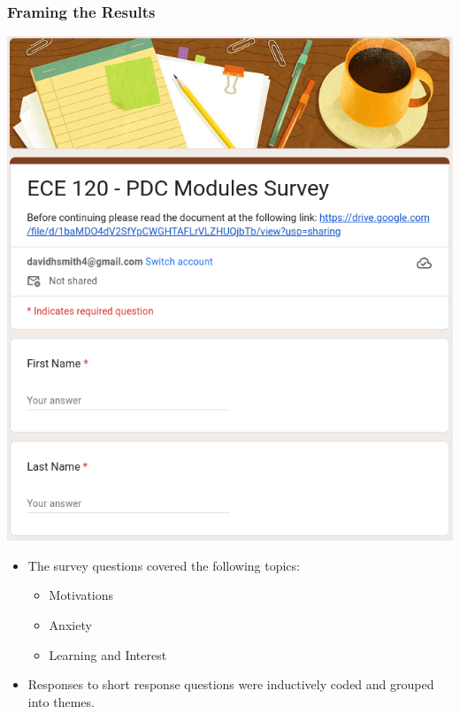 \documentclass{beamer}
\begin{document}
\begin{frame}[fragile]
    \frametitle{Framing the Results}

    \begin{minipage}{0.45\textwidth}
      \includegraphics[width=\textwidth]{survey.png}
    \end{minipage}
    \begin{minipage}{0.54\textwidth}
        \begin{itemize}
            \item The survey questions covered the following topics:
            \begin{itemize}
                \item Motivations
                \item Anxiety
                \item Learning and Interest
            \end{itemize}
            \item Responses to short response questions were inductively coded and grouped into themes.
        \end{itemize}
    \end{minipage}

\end{frame}
\end{document}
